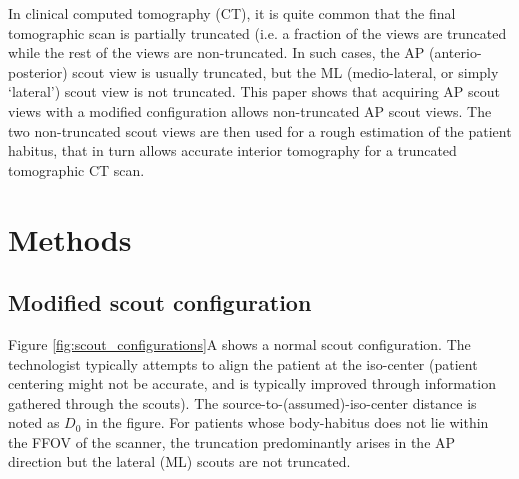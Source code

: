 \documentclass[]{spie}
\begin{document}
In clinical computed tomography (CT), it is quite common that the final tomographic scan is partially truncated (i.e. a fraction of the views are truncated while the rest of the views are non-truncated. In such cases, the AP (anterio-posterior) scout view is usually truncated, but the ML (medio-lateral, or simply `lateral') scout view is not truncated. This paper shows that acquiring AP scout views with a modified configuration allows non-truncated AP scout views. The two non-truncated scout views are then used for a rough estimation of the patient habitus, that in turn allows accurate interior tomography for a truncated tomographic CT scan. 

\section{Methods}
\label{sec:methods}




\subsection{Modified scout configuration}
\label{ssec:modified_scout}

Figure \ref{fig:scout_configurations}A shows a normal scout configuration. The technologist typically attempts to align the patient at the iso-center (patient centering might not be accurate, and is typically improved through information gathered through the scouts). The source-to-(assumed)-iso-center distance is noted as $D_0$ in the figure. For  patients whose body-habitus does not lie within the FFOV of the scanner, the truncation predominantly arises in the AP direction but the lateral (ML) scouts are not truncated. 
\end{document}
